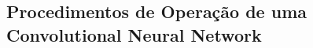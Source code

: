 \documentclass[aspectratio=169, xcolor=dvipsnames]{beamer}
\let\olditem=\item%
\renewcommand{\item}{\olditem \justifying}
\begin{document}
	\subsection{Procedimentos de Operação de uma Convolutional Neural Network}

\end{document}

